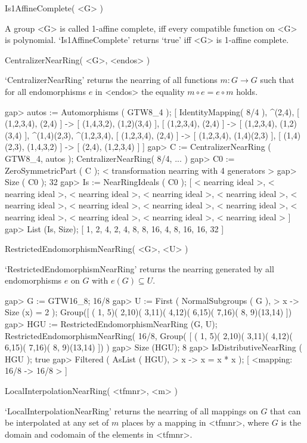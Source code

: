 \>Is1AffineComplete( <G> )

A group <G> is called 1-affine complete, iff every compatible function on <G> is
polynomial. `Is1AffineComplete' returns `true' iff <G> is 1-affine complete.

\>CentralizerNearRing( <G>, <endos> )

`CentralizerNearRing' returns the nearring of all functions
$m:G \rightarrow G$ such that for all endomorphisms $e$ in <endos> the
equality $m \circ e = e \circ m$ holds.

\beginexample
    gap> autos := Automorphisms ( GTW8_4 );
    [ IdentityMapping( 8/4 ), ^(2,4),
      [ (1,2,3,4), (2,4) ] -> [ (1,4,3,2), (1,2)(3,4) ],
      [ (1,2,3,4), (2,4) ] -> [ (1,2,3,4), (1,2)(3,4) ], ^(1,4)(2,3),
      ^(1,2,3,4), [ (1,2,3,4), (2,4) ] -> [ (1,2,3,4), (1,4)(2,3) ],
      [ (1,4)(2,3), (1,4,3,2) ] -> [ (2,4), (1,2,3,4) ] ]
    gap> C := CentralizerNearRing ( GTW8_4, autos );
    CentralizerNearRing( 8/4, ... )
    gap> C0 := ZeroSymmetricPart ( C );
    < transformation nearring with 4 generators >
    gap> Size ( C0 );
    32
    gap> Is := NearRingIdeals ( C0 );
    [ < nearring ideal >, < nearring ideal >, < nearring ideal >,
      < nearring ideal >, < nearring ideal >, < nearring ideal >,
      < nearring ideal >, < nearring ideal >, < nearring ideal >,
      < nearring ideal >, < nearring ideal >, < nearring ideal >,
      < nearring ideal > ]
    gap> List (Is, Size);
    [ 1, 2, 4, 2, 4, 8, 8, 16, 4, 8, 16, 16, 32 ]
\endexample

\>RestrictedEndomorphismNearRing( <G>, <U> )

`RestrictedEndomorphismNearRing' returns the nearring generated by all
endomorphisms $e$ on $G$ with $e(G) \subseteq U$.

\beginexample
    gap> G := GTW16_8;
    16/8
    gap> U := First ( NormalSubgroups ( G ),
    >              x -> Size (x) = 2 );
    Group([ ( 1, 5)( 2,10)( 3,11)( 4,12)( 6,15)( 7,16)( 8, 9)(13,14) ])
    gap> HGU := RestrictedEndomorphismNearRing (G, U);
    RestrictedEndomorphismNearRing( 16/8, Group(
    [ ( 1, 5)( 2,10)( 3,11)( 4,12)( 6,15)( 7,16)( 8, 9)(13,14) ]) )
    gap> Size (HGU);
    8
    gap> IsDistributiveNearRing ( HGU );
    true
    gap> Filtered ( AsList ( HGU),
    >       x -> x = x * x );
    [ <mapping: 16/8 -> 16/8 > ]
\endexample
 
\>LocalInterpolationNearRing( <tfmnr>, <m> )

`LocalInterpolationNearRing' returns the nearring of all mappings on
$G$ that can be interpolated at any set of $m$ places by a mapping in
<tfmnr>, where $G$ is the domain and codomain of the elements in
<tfmnr>.

